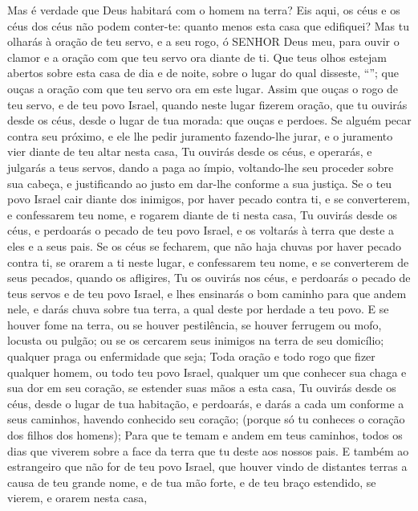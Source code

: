 {{  Mas é verdade que Deus habitará com o homem na terra? Eis aqui, os céus e os céus dos céus não podem conter-te: quanto menos esta casa que edifiquei?
  Mas tu olharás à oração de teu servo, e a seu rogo, ó SENHOR Deus meu, para ouvir o clamor e a oração com que teu servo ora diante de ti.
  Que teus olhos estejam abertos sobre esta casa de dia e de noite, sobre o lugar do qual disseste, \enquote{}; que ouças a oração com que teu servo ora em este lugar. %
  Assim que ouças o rogo de teu servo, e de teu povo Israel, quando neste lugar fizerem oração, que tu ouvirás desde os céus, desde o lugar de tua morada: que ouças e perdoes. %
  Se alguém pecar contra seu próximo, e ele lhe pedir juramento fazendo-lhe jurar, e o juramento vier diante de teu altar nesta casa,
  Tu ouvirás desde os céus, e operarás, e julgarás a teus servos, dando a paga ao ímpio, voltando-lhe seu proceder sobre sua cabeça, e justificando ao justo em dar-lhe conforme a sua justiça.
  Se o teu povo Israel cair diante dos inimigos, por haver pecado contra ti, e se converterem, e confessarem teu nome, e rogarem diante de ti nesta casa,
  Tu ouvirás desde os céus, e perdoarás o pecado de teu povo Israel, e os voltarás à terra que deste a eles e a seus pais.
  Se os céus se fecharem, que não haja chuvas por haver pecado contra ti, se orarem a ti neste lugar, e confessarem teu nome, e se converterem de seus pecados, quando os afligires, %
  Tu os ouvirás nos céus, e perdoarás o pecado de teus servos e de teu povo Israel, e lhes ensinarás o bom caminho para que andem nele, e darás chuva sobre tua terra, a qual deste por herdade a teu povo.
  E se houver fome na terra, ou se houver pestilência, se houver ferrugem ou mofo, locusta ou pulgão; ou se os cercarem seus inimigos na terra de seu domicílio; qualquer praga ou enfermidade que seja;
  Toda oração e todo rogo que fizer qualquer homem, ou todo teu povo Israel, qualquer um que conhecer sua chaga e sua dor em seu coração, se estender suas mãos a esta casa,
  Tu ouvirás desde os céus, desde o lugar de tua habitação, e perdoarás, e darás a cada um conforme a seus caminhos, havendo conhecido seu coração; (porque só tu conheces o coração dos filhos dos homens);
  Para que te temam e andem em teus caminhos, todos os dias que viverem sobre a face da terra que tu deste aos nossos pais.
  E também ao estrangeiro que não for de teu povo Israel, que houver vindo de distantes terras a causa de teu grande nome, e de tua mão forte, e de teu braço estendido, se vierem, e orarem nesta casa, %
}}
